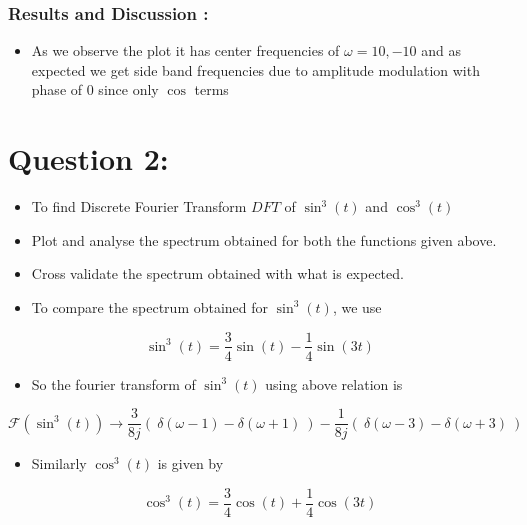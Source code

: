 \documentclass[8pt]{article}
\providecommand{\tightlist}{%
      \setlength{\itemsep}{0pt}\setlength{\parskip}{0pt}}
\begin{document}
    \subsubsection{Results and Discussion :}\label{results-and-discussion}

\begin{itemize}
\tightlist
\item
  As we observe the plot it has center frequencies of
  \(\omega = 10,-10\) and as expected we get side band frequencies due
  to amplitude modulation with phase of 0 since only $\cos $ terms
\end{itemize}

    \section{Question 2:}\label{question-2}

\begin{itemize}
\tightlist
\item
  To find Discrete Fourier Transform \(DFT\) of \(\sin ^{3}(t)\) and
  \(\cos^{3}(t)\)
\item
  Plot and analyse the spectrum obtained for both the functions given
  above.
\item
  Cross validate the spectrum obtained with what is expected.
\item
  To compare the spectrum obtained for \(\sin^{3}(t)\), we use
\end{itemize}

\begin{equation}
\sin^{3}(t) = \frac{3}{4}\sin(t) - \frac{1}{4}\sin(3t)
\end{equation}

\begin{itemize}
\tightlist
\item
  So the fourier transform of \(\sin^{3}(t)\) using above relation is
\end{itemize}

\begin{equation}
\mathcal {F}({\sin^{3}(t)})  \to \frac{3}{8j}(\ \delta(\omega -1) - \delta(\omega+1) \ ) - \frac{1}{8j}(\ \delta(\omega -3) - \delta(\omega+3) \ )
\end{equation}

\begin{itemize}
\tightlist
\item
  Similarly \(\cos^{3}(t)\) is given by
\end{itemize}

\begin{equation}
\cos^{3}(t) = \frac{3}{4}\cos(t) + \frac{1}{4}\cos(3t)
\end{equation}
\end{document}

